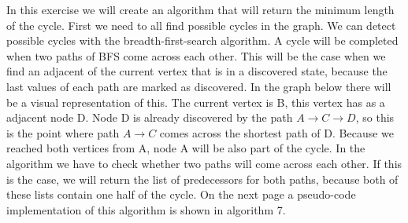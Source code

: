 \documentclass{article}
\begin{document}
In this exercise we will create an algorithm that will return the minimum length of the cycle. First we need to all find possible cycles in the graph. We can detect possible cycles with the breadth-first-search algorithm. A cycle will be completed when two paths of BFS come across each other. This will be the case when we find an adjacent of the current vertex that is in a discovered state, because the last values of each path are marked as discovered.
\newline
In the graph below there will be a visual representation of this. The current vertex is B, this vertex has as a adjacent node D. Node D is already discovered by the path $A \rightarrow C \rightarrow D$, so this is the point where path $A \rightarrow C$ comes across the shortest path of D. Because we reached both vertices from A, node A will be also part of the cycle.
\newline
In the algorithm we have to check whether two paths will come across each other. If this is the case, we will return the list of predecessors for both paths, because both of these lists contain one half of the cycle. On the next page a pseudo-code implementation of this algorithm is shown in algorithm 7.
\newline
{}
\end{document}
